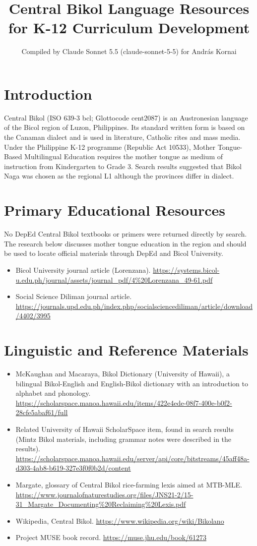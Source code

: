 \documentclass[12pt]{article}
\title{Central Bikol Language Resources for K-12 Curriculum Development}
\author{Compiled by Claude Sonnet 5.5 (claude-sonnet-5-5) for Andr\'as Kornai}
\date{}
\begin{document}
\maketitle

\section{Introduction}
Central Bikol (ISO 639-3 bcl; Glottocode cent2087) is an Austronesian language of the Bicol region of Luzon, Philippines. Its standard written form is based on the Canaman dialect and is used in literature, Catholic rites and mass media. Under the Philippine K-12 programme (Republic Act 10533), Mother Tongue-Based Multilingual Education requires the mother tongue as medium of instruction from Kindergarten to Grade 3. Search results suggested that Bikol Naga was chosen as the regional L1 although the provinces differ in dialect.

\section{Primary Educational Resources}
No DepEd Central Bikol textbooks or primers were returned directly by search. The research below discusses mother tongue education in the region and should be used to locate official materials through DepEd and Bicol University.
\begin{itemize}
\item Bicol University journal article (Lorenzana). \url{https://systems.bicol-u.edu.ph/journal/assets/journal_pdf/4%20Lorenzana_49-61.pdf}
\item Social Science Diliman journal article. \url{https://journals.upd.edu.ph/index.php/socialsciencediliman/article/download/4402/3995}
\end{itemize}

\section{Linguistic and Reference Materials}
\begin{itemize}
\item McKaughan and Macaraya, Bikol Dictionary (University of Hawaii), a bilingual Bikol-English and English-Bikol dictionary with an introduction to alphabet and phonology. \url{https://scholarspace.manoa.hawaii.edu/items/422e4ede-08f7-400e-b0f2-28cfe5abaf61/full}
\item Related University of Hawaii ScholarSpace item, found in search results (Mintz Bikol materials, including grammar notes were described in the results). \url{https://scholarspace.manoa.hawaii.edu/server/api/core/bitstreams/45aff48a-d303-4ab8-b619-327e3f0f0b2d/content}
\item Margate, glossary of Central Bikol rice-farming lexis aimed at MTB-MLE. \url{https://www.journalofnaturestudies.org/files/JNS21-2/15-31_Margate_Documenting%20Reclaiming%20Lexis.pdf}
\item Wikipedia, Central Bikol. \url{https://www.wikipedia.org/wiki/Bikolano}
\item Project MUSE book record. \url{https://muse.jhu.edu/book/61273}
\end{itemize}
\end{document}
